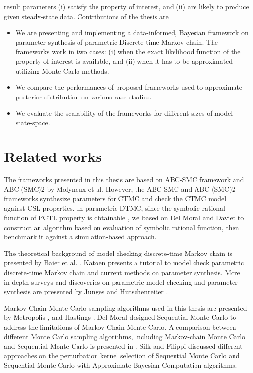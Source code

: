result parameters (i) satisfy the property of interest, and (ii) are likely to produce given
steady-state data. Contributions of the thesis are
\begin{itemize}
      \item We are presenting and implementing a data-informed, Bayesian framework on parameter
            synthesis of parametric Discrete-time Markov chain. The frameworks work in two cases:
            (i) when the exact likelihood function of the property of interest is available, and
            (ii) when it has to be approximated utilizing Monte-Carlo methods.
      \item We compare the performances of proposed frameworks used to approximate posterior
            distribution on various case studies.
      \item We evaluate the scalability of the frameworks for different sizes of model state-space.
\end{itemize}

\section{Related works}
The frameworks presented in this thesis are based on ABC-SMC framework \cite{molyneux2019bayesian}
and ABC-(SMC)2 \cite{molyneux2020abc} by Molyneux et al. However, the ABC-SMC and ABC-(SMC)2
frameworks synthesize parameters for CTMC and check the CTMC model against CSL properties. In
parametric DTMC, since the symbolic rational function of PCTL property is obtainable
\cite{daws2004symbolic}, we based on Del Moral \cite{del2006sequential} and Daviet
\cite{daviet2018inference} to construct an algorithm based on evaluation of symbolic rational
function, then benchmark it against a simulation-based approach.

The theoretical background of model checking discrete-time Markov chain is presented by Baier et al.
\cite{baier2008principles}. Katoen \cite{katoen2016probabilistic} presents a tutorial to model check
parametric discrete-time Markov chain and current methods on parameter synthesis. More in-depth
surveys and discoveries on parametric model checking and parameter synthesis are presented by Junges
\cite{junges2020parameter} and Hutschenreiter \cite{hutschenreiter2017parametric}.

Markov Chain Monte Carlo sampling algorithms used in this thesis are presented by Metropolis
\cite{metropolis1953equation}, and Hastings \cite{hastings1970monte}. Del Moral
\cite{del2006sequential} designed Sequential Monte Carlo to address the limitations of Markov Chain
Monte Carlo. A comparison between different Monte Carlo sampling algorithms, including Markov-chain
Monte Carlo and Sequential Monte Carlo is presented in \cite{daviet2018inference}. Silk
\cite{silk2012optimizing} and Filippi \cite{filippi2013optimality} discussed different approaches on
the perturbation kernel selection of Sequential Monte Carlo and Sequential Monte Carlo with
Approximate Bayesian Computation algorithms.

